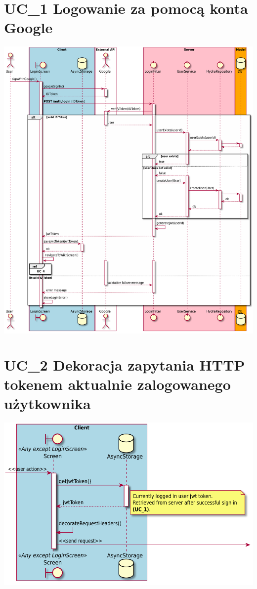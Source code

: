 \documentclass{scrreprt}
\begin{document}
\section{UC\_1 Logowanie za pomocą konta Google}
\includegraphics[width=\textwidth, keepaspectratio]{graphics/sequence_diagram_login.pdf}

\section{UC\_2 Dekoracja zapytania HTTP tokenem aktualnie zalogowanego użytkownika}
\includegraphics[width=\textwidth, keepaspectratio]{graphics/sequence_diagram_decorate_headers.pdf}
\end{document}
